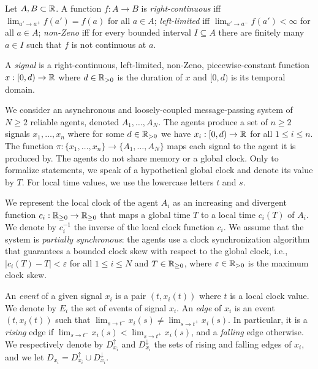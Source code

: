 Let $A,B \subset \mathbb{R}$.
A function $f : A \to B$ is
\emph{right-continuous} iff $\lim_{a' \to a^+} f(a') = f(a)$ for all $a \in A$;
\emph{left-limited} iff $\lim_{a' \to a^-} f(a') < \infty$ for all $a \in A$;
\emph{non-Zeno} iff for every bounded interval $I \subseteq A$ there are finitely many $a \in I$ such that $f$ is not continuous at $a$.

\begin{definition}
	A \emph{signal} is a right-continuous, left-limited, non-Zeno, piecewise-constant function $x : [0,d) \to \mathbb{R}$ where $d \in \mathbb{R}_{> 0}$ is the duration of $x$ and $[0,d)$ is its temporal domain.
\end{definition}

We consider an asynchronous and loosely-coupled message-passing system of $N \geq 2$ reliable agents, denoted $A_1, \ldots, A_N$.
The agents produce a set of $n \geq 2$ signals $x_1, \ldots, x_n$ where for some $d \in \mathbb{R}_{> 0}$ we have $x_i : [0,d) \to \mathbb{R}$ for all $1 \leq i \leq n$.
The function $\pi : \{x_1, \ldots, x_n\} \to \{A_1, \ldots, A_N\}$ maps each signal to the agent it is produced by.
The agents do not share memory or a global clock.
Only to formalize statements, we speak of a hypothetical global clock and denote its value by $T$.
For local time values, we use the lowercase letters $t$ and $s$.

We represent the local clock of the agent $A_i$ as an increasing and divergent function $c_i : \mathbb{R}_{\geq 0} \to \mathbb{R}_{\geq 0}$ that maps a global time $T$ to a local time $c_i(T)$ of $A_i$.
We denote by $c_i^{-1}$ the inverse of the local clock function $c_i$.
We assume that the system is \emph{partially synchronous}: the agents use a clock synchronization algorithm that guarantees a bounded clock skew with respect to the global clock, i.e., $|c_i(T) - T| < \varepsilon$ for all $1 \leq i \leq N$ and $T \in \mathbb{R}_{\geq 0}$, where $\varepsilon \in \mathbb{R}_{> 0}$ is the maximum clock skew.

An \emph{event} of a given signal $x_i$ is a pair $(t, x_i(t))$ where $t$ is a local clock value.
We denote by $E_i$ the set of events of signal $x_i$.
An \emph{edge} of $x_i$ is an event $(t, x_i(t))$ such that $\lim_{s \to t^-} x_i(s) \neq \lim_{s \to t^+} x_i(s)$.
In particular, it is a \emph{rising} edge if $\lim_{s \to t^-} x_i(s) < \lim_{s \to t^+} x_i(s)$, and a \emph{falling} edge otherwise.
We respectively denote by $D_{x_i}^\uparrow$ and $D_{x_i}^\downarrow$ the sets of rising and falling edges of $x_i$, and we let $D_{x_i} = D_{x_i}^\uparrow \cup D_{x_i}^\downarrow$.

